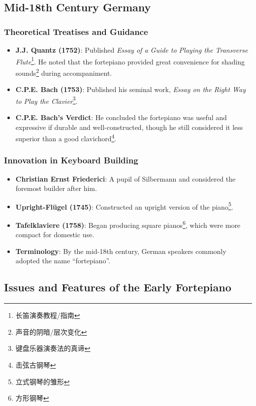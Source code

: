 \documentclass[math,code]{amznotes}
\theoremstyle{remark}
\begin{document}
\subsection{Mid-18th Century Germany}

\subsubsection{Theoretical Treatises and Guidance}
\begin{itemize}
    \item \textbf{J.J. Quantz (1752)}: Published \textit{Essay of a Guide to Playing the Transverse Flute}\footnote{长笛演奏教程/指南}. He noted that the fortepiano provided great convenience for shading sounds\footnote{声音的阴暗/层次变化} during accompaniment.
    \item \textbf{C.P.E. Bach (1753)}: Published his seminal work, \textit{Essay on the Right Way to Play the Clavier}\footnote{键盘乐器演奏法的真谛}.
    \item \textbf{C.P.E. Bach's Verdict}: He concluded the fortepiano was useful and expressive if durable and well-constructed, though he still considered it less superior than a good clavichord\footnote{击弦古钢琴}.
\end{itemize}

\subsubsection{Innovation in Keyboard Building}
\begin{itemize}
    \item \textbf{Christian Ernst Friederici}: A pupil of Silbermann and considered the foremost builder after him.
    \item \textbf{Upright-Flügel (1745)}: Constructed an upright version of the piano\footnote{立式钢琴的雏形}.
    \item \textbf{Tafelklaviere (1758)}: Began producing square pianos\footnote{方形钢琴}, which were more compact for domestic use.
    \item \textbf{Terminology}: By the mid-18th century, German speakers commonly adopted the name ``fortepiano''.
\end{itemize}

\subsection{Issues and Features of the Early Fortepiano}
\end{document}
